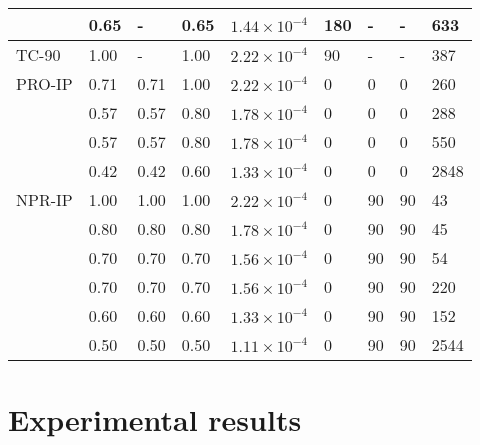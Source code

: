 \documentclass[preprint,5p,twocolumn,11pt,sort&compress]{elsarticle}
\newcommand{\marked}[1]{\textcolor{red}{#1}}
\begin{document}
\begin{table*}[htbp]
\begin{tabular}{p{2cm}p{1.5cm}<{\centering}p{1.5cm}<{\centering}p{1.5cm}<{\centering}p{2.5cm}<{\centering}p{1cm}<{\centering}p{1cm}<{\centering}p{1cm}<{\centering}p{1cm}}
          & 0.65  & -     & 0.65  & $1.44\times 10^{-4}$ & 180   & -     & -     & 633 \\
    \hline
    TC-90 & 1.00  & -     & 1.00  & $2.22\times 10^{-4}$ & 90    & -     & -     & 387 \\
    \hline
    PRO-IP & 0.71  & 0.71  & 1.00  & $2.22\times 10^{-4}$ & 0     & 0     & 0     & 260 \\
          & 0.57  & 0.57  & 0.80  & $1.78\times 10^{-4}$ & 0     & 0     & 0     & 288 \\
          & 0.57  & 0.57  & 0.80  & $1.78\times 10^{-4}$ & 0     & 0     & 0     & 550 \\
          & 0.42  & 0.42  & 0.60  & $1.33\times 10^{-4}$ & 0     & 0     & 0     & 2848 \\
    \hline
    NPR-IP & 1.00  & 1.00  & 1.00  & $2.22\times 10^{-4}$ & 0     & 90    & 90    & 43 \\
          & 0.80  & 0.80  & 0.80  & $1.78\times 10^{-4}$ & 0     & 90    & 90    & 45 \\
          & 0.70  & 0.70  & 0.70  & $1.56\times 10^{-4}$ & 0     & 90    & 90    & 54 \\
          & 0.70  & 0.70  & 0.70  & $1.56\times 10^{-4}$ & 0     & 90    & 90    & 220 \\
          & 0.60  & 0.60  & 0.60  & $1.33\times 10^{-4}$ & 0     & 90    & 90    & 152 \\
          & 0.50  & 0.50  & 0.50  & $1.11\times 10^{-4}$ & 0     & 90    & 90    & 2544 \\
    \hline
    \end{tabular}%
  \label{Tab:TestMatrix}%
\end{table*}%



\section{Experimental results}
\end{document}

